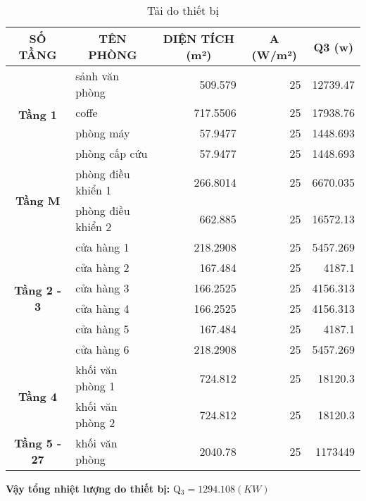 \begin{table}[H]
	\centering
	\caption{Tải do thiết bị}
	\begin{tabular}{|c|l|r|r|r|}
		\hline
		\textbf{SỐ TẦNG} & \multicolumn{1}{c|}{\textbf{TÊN PHÒNG}} & \multicolumn{1}{c|}{\textbf{DIỆN TÍCH (m²) }} & \multicolumn{1}{c|}{\textbf{A (W/m²)}} & \multicolumn{1}{c|}{\textbf{Q3 (w)}} \bigstrut\\
		\hline
		\multirow{4}[8]{*}{\textbf{Tầng 1}} & sảnh văn phòng & 509.579  & 25       & 12739.47 \bigstrut\\
		\cline{2-5}             & coffe    & 717.5506 & 25       & 17938.76 \bigstrut\\
		\cline{2-5}             & phòng máy & 57.9477  & 25       & 1448.693 \bigstrut\\
		\cline{2-5}             & phòng cấp cứu & 57.9477  & 25       & 1448.693 \bigstrut\\
		\hline
		\multirow{2}[4]{*}{\textbf{Tầng M}} & phòng điều khiển 1 & 266.8014 & 25       & 6670.035 \bigstrut\\
		\cline{2-5}             & phòng điều khiển 2 & 662.885  & 25       & 16572.13 \bigstrut\\
		\hline
		\multirow{6}[12]{*}{\textbf{Tầng 2 - 3}} & cửa hàng 1 & 218.2908 & 25       & 5457.269 \bigstrut\\
		\cline{2-5}             & cửa hàng 2 & 167.484  & 25       & 4187.1 \bigstrut\\
		\cline{2-5}             & cửa hàng 3 & 166.2525 & 25       & 4156.313 \bigstrut\\
		\cline{2-5}             & cửa hàng 4 & 166.2525 & 25       & 4156.313 \bigstrut\\
		\cline{2-5}             & cửa hàng 5 & 167.484  & 25       & 4187.1 \bigstrut\\
		\cline{2-5}             & cửa hàng 6 & 218.2908 & 25       & 5457.269 \bigstrut\\
		\hline
		\multirow{2}[4]{*}{\textbf{Tầng 4}} & khối văn phòng 1 & 724.812  & 25       & 18120.3 \bigstrut\\
		\cline{2-5}             & khối văn phòng 2 & 724.812  & 25       & 18120.3 \bigstrut\\
		\hline
		\textbf{Tầng 5 - 27} & khối văn phòng & 2040.78  & 25       & 1173449 \bigstrut\\
		\hline
	\end{tabular}%
	\label{b:ttb}%
\end{table}%
\textbf{Vậy tổng nhiệt lượng do thiết bị:} Q$_{3} = 1294.108(KW)$

